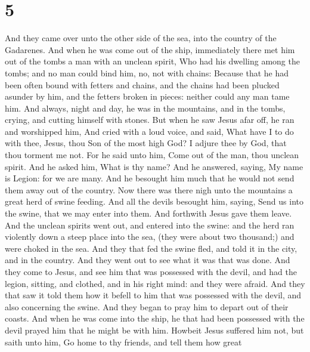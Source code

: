 \hypertarget{section-4}{%
\section{5}\label{section-4}}

 And they came over unto the other side of the sea, into
the country of the Gadarenes.  And when he was come out of
the ship, immediately there met him out of the tombs a man with an
unclean spirit,  Who had his dwelling among the tombs; and
no man could bind him, no, not with chains:  Because that
he had been often bound with fetters and chains, and the chains had been
plucked asunder by him, and the fetters broken in pieces: neither could
any man tame him.  And always, night and day, he was in
the mountains, and in the tombs, crying, and cutting himself with
stones.  But when he saw Jesus afar off, he ran and
worshipped him,  And cried with a loud voice, and said,
What have I to do with thee, Jesus, thou Son of the most high God? I
adjure thee by God, that thou torment me not.  For he said
unto him, Come out of the man, thou unclean spirit.  And
he asked him, What is thy name? And he answered, saying, My name is
Legion: for we are many.  And he besought him much that
he would not send them away out of the country.  Now
there was there nigh unto the mountains a great herd of swine feeding.
 And all the devils besought him, saying, Send us into
the swine, that we may enter into them.  And forthwith
Jesus gave them leave. And the unclean spirits went out, and entered
into the swine: and the herd ran violently down a steep place into the
sea, (they were about two thousand;) and were choked in the sea.
 And they that fed the swine fled, and told it in the
city, and in the country. And they went out to see what it was that was
done.  And they come to Jesus, and see him that was
possessed with the devil, and had the legion, sitting, and clothed, and
in his right mind: and they were afraid.  And they that
saw it told them how it befell to him that was possessed with the devil,
and also concerning the swine.  And they began to pray
him to depart out of their coasts.  And when he was come
into the ship, he that had been possessed with the devil prayed him that
he might be with him.  Howbeit Jesus suffered him not,
but saith unto him, Go home to thy friends, and tell them how great
